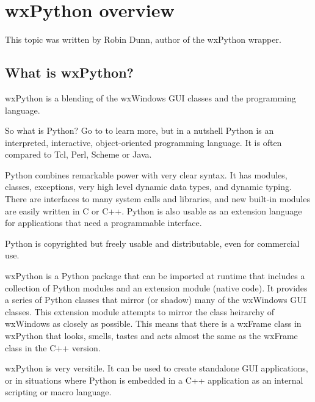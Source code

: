 \section{wxPython overview}\label{wxpython}

This topic was written by Robin Dunn, author of the wxPython wrapper.

\subsection{What is wxPython?}\label{wxpwhat}

wxPython is a blending of the wxWindows GUI classes and the
 programming language.


So what is Python?  Go to
 to learn more,
but in a nutshell Python is an interpreted,
interactive, object-oriented programming language. It is often
compared to Tcl, Perl, Scheme or Java.

Python combines remarkable power with very clear syntax. It has
modules, classes, exceptions, very high level dynamic data types, and
dynamic typing. There are interfaces to many system calls and
libraries, and new built-in modules are easily written in C or
C++. Python is also usable as an extension language for applications
that need a programmable interface.

Python is copyrighted but freely usable and distributable, even for
commercial use.


wxPython is a Python package that can be imported at runtime that
includes a collection of Python modules and an extension module
(native code). It provides a series of Python classes that mirror (or
shadow) many of the wxWindows GUI classes. This extension module
attempts to mirror the class heirarchy of wxWindows as closely as
possible. This means that there is a wxFrame class in wxPython that
looks, smells, tastes and acts almost the same as the wxFrame class in
the C++ version.

wxPython is very versitile. It can be used to create standalone GUI
applications, or in situations where Python is embedded in a C++
application as an internal scripting or macro language.

